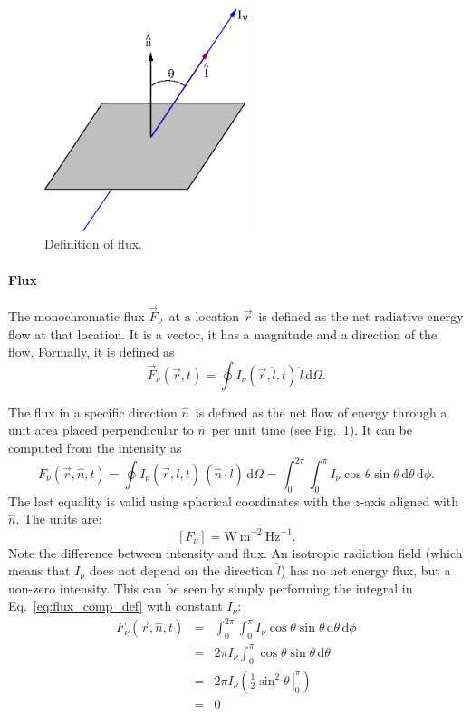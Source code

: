 \documentclass[12pt]{article}
\numberwithin{equation}{section}
\def\dd{\mathrm{d}}
\def\Inu{\ensuremath{I_{\nu}}}
\def\dO{\ensuremath{\dd \Omega}}
\def\vr{\ensuremath{\vec{r}}}
\def\un{\ensuremath{\hat{n}}}
\def\ul{\ensuremath{\hat{l}}}
\newcommand{\be}{\begin{equation}}
\newcommand{\ee}{\end{equation}}
\newcommand{\bea}{\begin{eqnarray}}
\newcommand{\eea}{\end{eqnarray}}
\begin{document}


\begin{figure}
  \centering
  \includegraphics[width=6cm]{figs/flux_def}
  \caption{Definition of flux.
  \label{fig:flux_def}}
\end{figure}


\paragraph{Flux} 
The monochromatic flux $\vec{F}_\nu$\ at a location \vr\ is defined as the net radiative energy flow at that location. It is a vector, it has a magnitude and a direction of the flow. Formally, it is defined as
\be
\vec{F}_\nu (\vr,t) = \oint \Inu(\vr,\ul,t) \, \ul \, \dO.
\ee

The flux in a specific direction \un\ is defined as the net flow of energy through a unit area placed perpendicular to \un\  per unit time (see Fig.~\ref{fig:flux_def}). It can be computed from the intensity as
\be \label{eq:flux_comp_def}
F_\nu (\vr, \un, t) = \oint \Inu (\vr,\ul,t) \, (\un \cdot \ul) \, \dO = \int_0^{2\pi} \int_0^\pi \Inu \cos \theta \sin \theta \, \dd \theta\, \dd \phi.
\ee 
The last equality is valid  using spherical coordinates with the $z$-axis aligned with \un. The units are:
\be
\left[ F_\nu  \right] = \mathrm{W\ m}^{-2} \ \mathrm{Hz}^{-1}.
\ee
Note the difference between intensity and flux. An isotropic radiation field (which means that $\Inu$ does not depend on the direction $\ul$) has no net energy flux, but a non-zero intensity. This can be seen by simply performing the integral in Eq.~\ref{eq:flux_comp_def} with constant $\Inu$:
\bea
F_\nu (\vr, \un, t) &=& \int_0^{2\pi} \int_0^\pi \Inu \cos \theta \sin \theta \, \dd \theta\, \dd \phi \nonumber \\ 
& = & 2\pi \Inu \int_0^\pi  \cos \theta \sin \theta \, \dd \theta \nonumber \\
& = & 2 \pi \Inu \left(  \left. \frac{1}{2} \sin^2{\theta} \, \right|^\pi_0 \right) \nonumber \\
& = & 0
\eea
\end{document}
